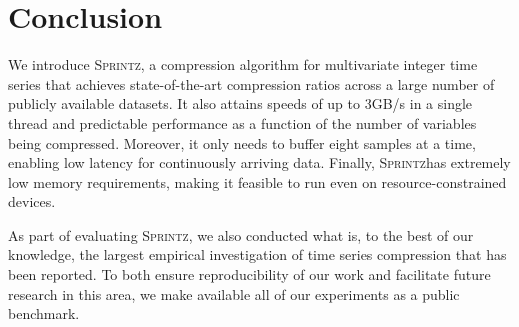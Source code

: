 \documentclass[acmlarge]{acmart}
\newcommand{\mine}{\textsc{Sprintz}}
\newcommand{\minesp}{\textsc{Sprintz}\text{ }}
\newcommand{\fire}{\textsc{Fire}\text{ }}
\begin{document}
\section{Conclusion} \label{sec:conclusion}

We introduce \mine, a compression algorithm for multivariate integer time series that achieves state-of-the-art compression ratios across a large number of publicly available datasets. It also attains speeds of up to 3GB/s in a single thread and predictable performance as a function of the number of variables being compressed. Moreover, it only needs to buffer eight samples at a time, enabling low latency for continuously arriving data. Finally, \minesp has extremely low memory requirements, making it feasible to run even on resource-constrained devices.

As part of evaluating \mine, we also conducted what is, to the best of our knowledge, the largest empirical investigation of time series compression that has been reported. To both ensure reproducibility of our work and facilitate future research in this area, we make available all of our experiments as a public benchmark.








\end{document}
